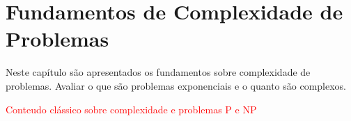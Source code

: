 
\chapter{Fundamentos de Complexidade de Problemas}
\label{cp:complexidade}


Neste capítulo são apresentados os fundamentos sobre
complexidade de problemas.  Avaliar o que são problemas
exponenciais e o quanto são complexos.

\textcolor{red}{Conteudo clássico sobre complexidade e problemas P e NP}